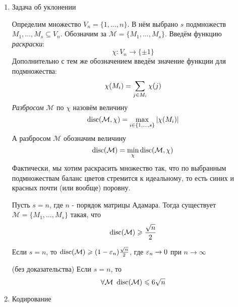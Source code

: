 \begin{enumerate}
	\item Задача об уклонении
	
	Определим множество $V_n = \{1, \ldots, n\}$. В нём выбрано $s$ подмножеств $M_1, \ldots, M_s \subseteq V_n$. Обозначим за $\mathcal{M} = \{M_1, \ldots, M_s\}$. Введём функцию \textit{раскраски}:
	\[
		\chi \colon V_n \to \{\pm 1\}
	\]
	Дополнительно с тем же обозначением введём значение функции для подмножества:
	\[
		\chi(M_i) = \sum\limits_{j \in M_i} \chi(j)
	\]
	\textit{Разбросом} $\mathcal{M}$ по $\chi$ назовём величину
	\[
		\operatorname{disc}(\mathcal{M}, \chi) = \max\limits_{i \in \{1, \ldots, s\}} |\chi(M_i)|
	\]
	А разбросом $\mathcal{M}$ обозначим величину
	\[
		\operatorname{disc}(\mathcal{M}) = \min\limits_{\chi} \operatorname{disc} (\mathcal{M}, \chi)
	\]
	Фактически, мы хотим раскрасить множество так, что по выбранным подмножествам баланс цветов стремится к идеальному, то есть синих и красных почти (или вообще) поровну.
	
	\begin{theorem}
		Пусть $s = n$, где $n$ - порядок матрицы Адамара. Тогда существует $\mathcal{M} = \{M_1, \ldots, M_s\}$ такая, что
		\[
			\operatorname{disc}(\mathcal{M}) \geqslant \frac{\sqrt{n}}{2}
		\]
	\end{theorem}

	
	\begin{corollary}
		Если $s = n$, то $\operatorname{disc}(\mathcal{M}) \geqslant (1 - \varepsilon_n) \frac{\sqrt{n}}{2}$, где $\varepsilon_n \to 0$ при $n \to \infty$
	\end{corollary}

	\begin{theorem} (без доказательства)
		Если $s = n$, то
		\[
			\forall \mathcal{M}\ \operatorname{disc}(\mathcal{M}) \leqslant 6\sqrt{n}
		\]
	\end{theorem}
	
	\item Кодирование
\end{enumerate}